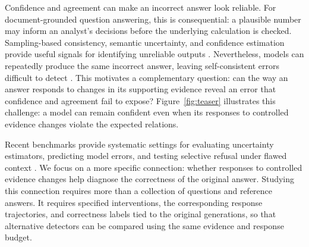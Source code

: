 \documentclass[11pt]{article}
\newcommand{\CST}{\textsc{CST}}
\begin{document}
Confidence and agreement can make an incorrect answer look reliable. For document-grounded question answering, this is consequential: a plausible number may inform an analyst's decisions before the underlying calculation is checked. Sampling-based consistency, semantic uncertainty, and confidence estimation provide useful signals for identifying unreliable outputs \citep{manakul-etal-2023-selfcheckgpt, farquhar-etal-2024-semantic,geng-etal-2024-survey}. Nevertheless, models can repeatedly produce the same incorrect answer, leaving self-consistent errors difficult to detect \citep{tan-etal-2025-consistent}. This motivates a complementary question: can the way an answer responds to changes in its supporting evidence reveal an error that confidence and agreement fail to expose? Figure~\ref{fig:teaser} illustrates this challenge: a model can remain confident even when its responses to controlled evidence changes violate the expected relations.


Recent benchmarks provide systematic settings for evaluating uncertainty estimators, predicting model errors, and testing selective refusal under flawed context \citep{vashurin-etal-2025-benchmarking, pacchiardi-etal-2025-predictaboard, muhamed-etal-2026-refusalbench}. We focus on a more specific connection: whether responses to controlled evidence changes help diagnose the correctness of the original answer. Studying this connection requires more than a collection of questions and reference answers. It requires specified interventions, the corresponding response trajectories, and correctness labels tied to the original generations, so that alternative detectors can be compared using the same evidence and response budget.

\end{document}
